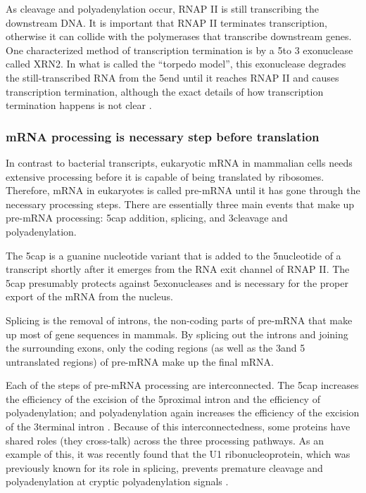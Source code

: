 As cleavage and polyadenylation occur, RNAP II is still transcribing the
downstream DNA. It is important that RNAP II terminates transcription,
otherwise it can collide with the polymerases that transcribe downstream
genes. One characterized method of transcription termination is by a 5\p to 3\p
exonuclease called XRN2. In what is called the ``torpedo model'', this
exonuclease degrades the still-transcribed RNA from the 5\p end until it
reaches RNAP II and causes transcription termination, although the exact
details of how transcription termination happens is not clear
\cite{kuehner_unravelling_2011}.

\subsubsection{mRNA processing is necessary step before translation}
In contrast to bacterial transcripts, eukaryotic mRNA in mammalian cells needs
extensive processing before it is capable of being translated by ribosomes.
Therefore, mRNA in eukaryotes is called pre-mRNA until it has gone through the
necessary processing steps. There are essentially three main events that make
up pre-mRNA processing: 5\p cap addition, splicing, and 3\p cleavage and
polyadenylation.

The 5\p cap is a guanine nucleotide variant that is added to the 5\p nucleotide
of a transcript shortly after it emerges from the RNA exit channel of RNAP II.
The 5\p cap presumably protects against 5\p exonucleases and is necessary for
the proper export of the mRNA from the nucleus.

Splicing is the removal of introns, the non-coding parts of pre-mRNA that make
up most of gene sequences in mammals. By splicing out the introns and joining
the surrounding exons, only the coding regions (as well as the 3\p and 5\p
untranslated regions) of pre-mRNA make up the final mRNA.

Each of the steps of pre-mRNA processing are interconnected. The 5\p cap
increases the efficiency of the excision of the 5\p proximal intron and the
efficiency of polyadenylation; and polyadenylation again increases the
efficiency of the excision of the 3\p terminal intron
\cite{proudfoot_integrating_2002}. Because of this interconnectedness, some
proteins have shared roles (they cross-talk) across the three processing
pathways. As an example of this, it was recently found that the U1
ribonucleoprotein, which was previously known for its role in splicing,
prevents premature cleavage and polyadenylation at cryptic polyadenylation
signals \cite{kaida_u1_2010}.

